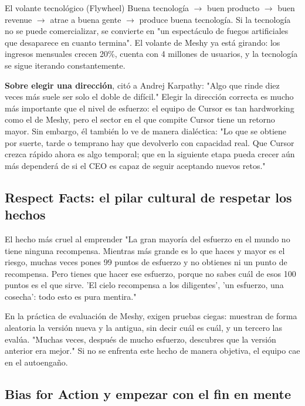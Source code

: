 \begin{importantbox}{El volante tecnológico (Flywheel)}
Buena tecnología $\rightarrow$ buen producto $\rightarrow$ buen revenue $\rightarrow$ atrae a buena gente $\rightarrow$ produce buena tecnología. Si la tecnología no se puede comercializar, se convierte en "un espectáculo de fuegos artificiales que desaparece en cuanto termina". El volante de Meshy ya está girando: los ingresos mensuales crecen 20\%, cuenta con 4 millones de usuarios, y la tecnología se sigue iterando constantemente.
\end{importantbox}

\textbf{Sobre elegir una dirección}, citó a Andrej Karpathy: "Algo que rinde diez veces más suele ser solo el doble de difícil." Elegir la dirección correcta es mucho más importante que el nivel de esfuerzo: el equipo de Cursor es tan hardworking como el de Meshy, pero el sector en el que compite Cursor tiene un retorno mayor. Sin embargo, él también lo ve de manera dialéctica: "Lo que se obtiene por suerte, tarde o temprano hay que devolverlo con capacidad real. Que Cursor crezca rápido ahora es algo temporal; que en la siguiente etapa pueda crecer aún más dependerá de si el CEO es capaz de seguir aceptando nuevos retos."

\subsection{Respect Facts: el pilar cultural de respetar los hechos}

\begin{warningbox}{El hecho más cruel al emprender}
"La gran mayoría del esfuerzo en el mundo no tiene ninguna recompensa. Mientras más grande es lo que haces y mayor es el riesgo, muchas veces pones 99 puntos de esfuerzo y no obtienes ni un punto de recompensa. Pero tienes que hacer ese esfuerzo, porque no sabes cuál de esos 100 puntos es el que sirve. 'El cielo recompensa a los diligentes', 'un esfuerzo, una cosecha': todo esto es pura mentira."
\end{warningbox}

En la práctica de evaluación de Meshy, exigen pruebas ciegas: muestran de forma aleatoria la versión nueva y la antigua, sin decir cuál es cuál, y un tercero las evalúa. "Muchas veces, después de mucho esfuerzo, descubres que la versión anterior era mejor." Si no se enfrenta este hecho de manera objetiva, el equipo cae en el autoengaño.

\subsection{Bias for Action y empezar con el fin en mente}

